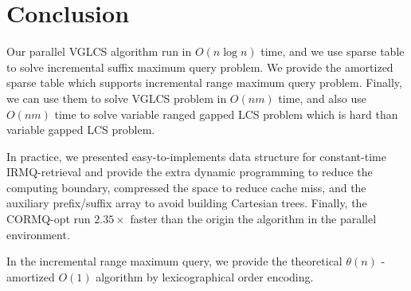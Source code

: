 \section{Conclusion}
\label{sec:Conclusion}

Our parallel VGLCS algorithm run in $O(n \log n)$ time, and we use
sparse table to solve incremental suffix maximum query problem.  We
provide the amortized sparse table which supports incremental range
maximum query problem.  Finally, we can use them to solve VGLCS problem
in $O(nm)$ time, and also use $O(nm)$ time to solve variable
ranged gapped LCS problem which is hard than variable gapped LCS problem.

In practice, we presented easy-to-implements data structure for
constant-time IRMQ-retrieval and provide the extra dynamic programming to
reduce the computing boundary, compressed the space to reduce cache
miss, and the auxiliary prefix/suffix array to avoid building
Cartesian trees. Finally, the CORMQ-opt run $2.35 \times$ faster than
the origin the algorithm in the parallel environment.

In the incremental range maximum query, we provide the theoretical
$\theta(n)$ - amortized $O(1)$ algorithm by lexicographical order
encoding.

\iffalse
我們修改 VGLCS 的序列算法，將其平行化於 $\theta(n \log n)$ 時間內，
並以稀疏表實作 ISMQ 問題。提出的稀疏表能解決比 VGLCS 更困難的 Variable Range Gapped LCS，
致使 VIGLCS 可在時間複雜度 $\theta(nm)$ 被解決。

在實務上，我們提供以動態規劃減少計算量，以及使用空間壓縮降低快取未中的策略，
最終平行 RMQ 獲取 $2.35 \times$ 倍的加速；在增長區間最大值詢問 (IRMQ) 問題中，
以字典順序的編碼策略，提出理論 $\theta(n)$ -- amortized $\theta(1)$  的算法。
\fi